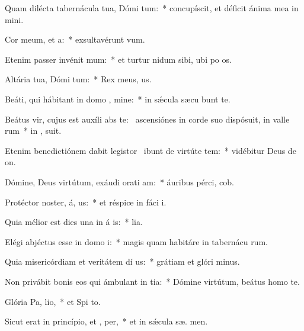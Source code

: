 \item Quam dilécta tabernácula tua, Dómi tum:~* concupíscit, et déficit ánima mea in  mini.
\item Cor meum, et  a:~* exsultavérunt   vum.
\item Etenim passer invénit  mum:~* et turtur nidum sibi, ubi po  os.
\item Altária tua, Dómi tum:~* Rex meus,   us.
\item Beáti, qui hábitant in domo , mine:~* in sǽcula sæcu bunt te.
\item Beátus vir, cujus est auxíli abs te:~\pscross{} ascensiónes in corde suo dispósuit, in valle rum~* in ,  suit.
\item Etenim benedictiónem dabit legistor~\pscross{} ibunt de virtúte  tem:~* vidébitur Deus de  on.
\item Dómine, Deus virtútum, exáudi orati am:~* áuribus pérci,  cob.
\item Protéctor noster, á, us:~* et réspice in fáci  i.
\item Quia mélior est dies una in á is:~*  lia.
\item Elégi abjéctus esse in domo  i:~* magis quam habitáre in tabernácu rum.
\item Quia misericórdiam et veritátem dí us:~* grátiam et glóri  minus.
\item Non privábit bonis eos qui ámbulant in tia:~* Dómine virtútum, beátus homo    te.
\item Glória Pa,  lio,~* et Spi to.
\item Sicut erat in princípio, et ,  per,~* et in sǽcula sæ. men.
